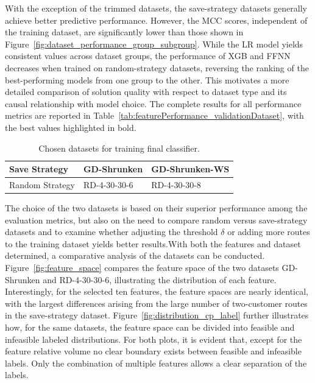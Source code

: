 With the exception of the trimmed datasets, the save-strategy datasets generally achieve better predictive performance.
However, the MCC scores, independent of the training dataset, are significantly lower than those shown in
Figure~\ref{fig:dataset_performance_group_subgroup}. While the LR model yields consistent values across dataset groups,
the performance of XGB and FFNN decreases when trained on random-strategy datasets, reversing the ranking of the best-performing
models from one group to the other. This motivates a more detailed comparison of solution quality with respect to dataset type and
its causal relationship with model choice. The complete results for all performance metrics are reported in Table~\ref{tab:featurePerformance_validationDataset},
with the best values highlighted in bold.
\begin{table}[ht]
    \centering
    \small
    \setlength{\tabcolsep}{0.75em}
    \def\arraystretch{1.25}
    \begin{tabular}{lll}
        \toprule
        Save Strategy   & GD-Shrunken  & GD-Shrunken-WS \\\midrule
        Random Strategy & RD-4-30-30-6 & RD-4-30-30-8   \\
        \bottomrule
    \end{tabular}
    \caption{Chosen datasets for training final classifier.}
    \label{tab:chosen_datasets}
\end{table}
The choice of the two datasets is based on their superior performance among the evaluation metrics,
but also on the need to compare random versus save-strategy datasets and to examine whether adjusting the threshold $\delta$ or adding
more routes to the training dataset yields better results.With both the features and dataset determined, a comparative analysis of the
datasets can be conducted. Figure~\ref{fig:feature_space} compares the feature space of the two datasets GD-Shrunken and RD-4-30-30-6,
illustrating the distribution of each feature. Interestingly, for the selected ten features, the feature spaces are nearly identical,
with the largest differences arising from the large number of two-customer routes in the save-strategy dataset.
Figure~\ref{fig:distribution_cp_label} further illustrates how, for the same datasets, the feature space can be divided into
feasible and infeasible labeled distributions. For both plots, it is evident that, except for the feature relative volume
no clear boundary exists between feasible and infeasible labels. Only the combination of multiple features allows a clear
separation of the labels.

